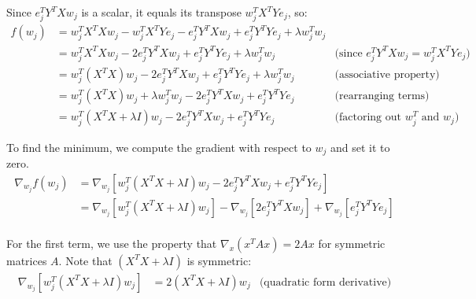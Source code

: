 \documentclass{article}
\begin{document}
\begin{aprob}
\begin{tcolorbox}[colback=lightgray!10!white, colframe=black, title=A5.a, breakable]
        Since $e_j^T Y^T X w_j$ is a scalar, it equals its transpose $w_j^T X^T Y e_j$, so:
        \begin{align*}
        f(w_j) &= w_j^T X^T X w_j - w_j^T X^T Y e_j - e_j^T Y^T X w_j + e_j^T Y^T Y e_j + \lambda w_j^T w_j \\
        &= w_j^T X^T X w_j - 2e_j^T Y^T X w_j + e_j^T Y^T Y e_j + \lambda w_j^T w_j & \text{(since $e_j^T Y^T X w_j = w_j^T X^T Y e_j$)} \\
        &= w_j^T(X^T X)w_j - 2e_j^T Y^T X w_j + e_j^T Y^T Y e_j + \lambda w_j^T w_j & \text{(associative property)} \\
        &= w_j^T(X^T X)w_j + \lambda w_j^T w_j - 2e_j^T Y^T X w_j + e_j^T Y^T Y e_j & \text{(rearranging terms)} \\
        &= w_j^T(X^T X + \lambda I)w_j - 2e_j^T Y^T X w_j + e_j^T Y^T Y e_j & \text{(factoring out $w_j^T$ and $w_j$)}
        \end{align*}
        
        To find the minimum, we compute the gradient with respect to $w_j$ and set it to zero.
        \begin{align*}
        \nabla_{w_j} f(w_j) &= \nabla_{w_j}[w_j^T(X^T X + \lambda I)w_j - 2e_j^T Y^T X w_j + e_j^T Y^T Y e_j] \\
        &= \nabla_{w_j}[w_j^T(X^T X + \lambda I)w_j] - \nabla_{w_j}[2e_j^T Y^T X w_j] + \nabla_{w_j}[e_j^T Y^T Y e_j] \\
        \end{align*}
        
        For the first term, we use the property that $\nabla_x(x^TAx) = 2Ax$ for symmetric matrices $A$. Note that $(X^T X + \lambda I)$ is symmetric:
        \begin{align*}
        \nabla_{w_j}[w_j^T(X^T X + \lambda I)w_j] &= 2(X^T X + \lambda I)w_j & \text{(quadratic form derivative)}
        \end{align*}
        

\end{tcolorbox}
\end{aprob}
\end{document}
